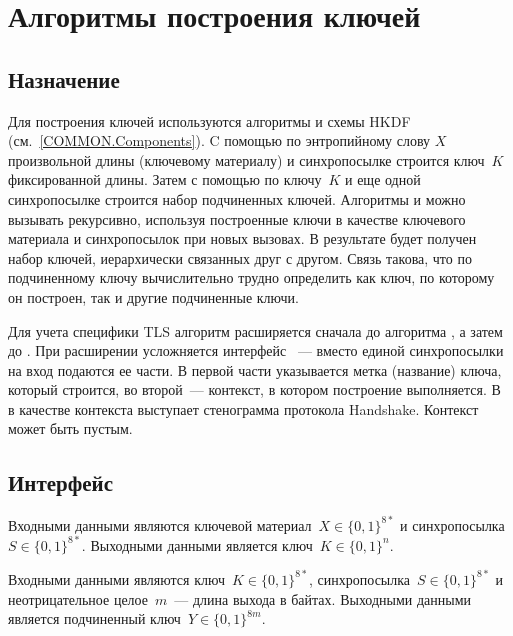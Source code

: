 \section{Алгоритмы построения ключей}\label{CRYPTO.HKDF}

\subsection{Назначение}\label{CRYPTO.HKDF.Intro}

Для построения ключей используются алгоритмы  и 
 схемы HKDF (см.~\ref{COMMON.Components}).
%
C помощью  по энтропийному слову $X$ произвольной длины
(ключевому материалу) и синхропосылке строится ключ~$K$ фиксированной длины.
%
Затем с помощью  по ключу~$K$ и еще одной синхропосылке
строится набор подчиненных ключей.
%
Алгоритмы  и  можно вызывать рекурсивно,
используя построенные ключи в качестве ключевого материала и синхропосылок
при новых вызовах.
%
В результате будет получен набор ключей, иерархически связанных друг с другом.
%
Связь такова, что по подчиненному ключу вычислительно трудно определить как ключ, 
по которому он построен, так и другие подчиненные ключи.

Для учета специфики TLS алгоритм  расширяется сначала до алгоритма
, а затем до . При расширении
усложняется интерфейс ~--- вместо единой синхропосылки на вход
подаются ее части. 
%
В первой части указывается метка (название) ключа, который строится, во второй~--- 
контекст, в котором построение выполняется. В  в качестве 
контекста выступает стенограмма протокола Handshake. Контекст может быть пустым. 

\subsection{Интерфейс}\label{CRYPTO.HKDF.IFace}

Входными данными  являются ключевой
материал~$X\in\{0,1\}^{8*}$ и синхропосылка~$S\in\{0,1\}^{8*}$. Выходными
данными является ключ~$K\in\{0,1\}^n$.

Входными данными  являются ключ~$K\in\{0,1\}^{8*}$,
синхропосылка~$S\in\{0,1\}^{8*}$ и неотрицательное целое~$m$~--- длина выхода в 
байтах. Выходными данными является подчиненный ключ~$Y\in\{0,1\}^{8m}$.

